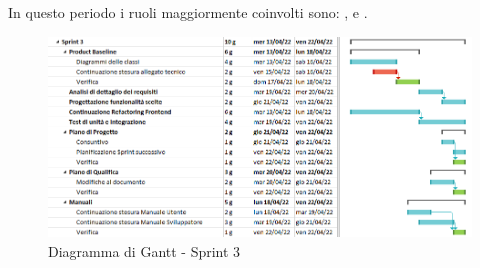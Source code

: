 In questo periodo i ruoli maggiormente coinvolti sono: \roleDesignerLow{}, \roleProgrammerLow{} e \roleVerifierLow{}.
\begin{figure}[H]
  \centering
  \includegraphics[scale=0.55]{immagini/3sprint.png}
  \caption{Diagramma di Gantt - Sprint 3}
\end{figure}

